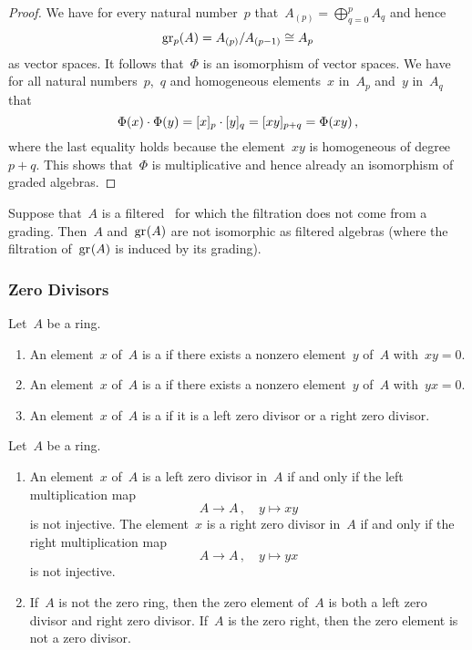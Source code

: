 \begin{proof}
	We have for every natural number~$p$ that~$A_{(p)} = \bigoplus_{q=0}^p A_q$ and hence
	\[
		\gr[p](A)
		=
		A_{(p)} / A_{(p-1)}
		\cong
		A_p
	\]
	as vector spaces.
	It follows that~$\Phi$ is an isomorphism of vector spaces.
	We have for all natural numbers~$p$,~$q$ and homogeneous elements~$x$ in~$A_p$ and~$y$ in~$A_q$ that
	\[
		\Phi(x) \cdot \Phi(y)
		=
		\lbrack x\rbrack_p \cdot \lbrack y\rbrack_q
		=
		\lbrack xy\rbrack_{p+q}
		=
		\Phi(xy) \,,
	\]
	where the last equality holds because the element~$xy$ is homogeneous of degree~$p + q$.
	This shows that~$\Phi$ is multiplicative and hence already an isomorphism of graded algebras.
\end{proof}


\begin{warning}
	Suppose that~$A$ is a filtered~\algebra{$\kf$} for which the filtration does not come from a grading.
	Then~$A$ and~$\gr(A)$ are not isomorphic as filtered algebras (where the filtration of~$\gr(A)$ is induced by its grading).
\end{warning}

\subsubsection{Zero Divisors}

\begin{definition}
	Let~$A$ be a ring.
	\begin{enumerate}
		\item
			An element~$x$ of~$A$ is a  if there exists a nonzero element~$y$ of~$A$ with~$xy = 0$.
		\item
			An element~$x$ of~$A$ is a  if there exists a nonzero element~$y$ of~$A$ with~$yx = 0$.
		\item
			An element~$x$ of~$A$ is a  if it is a left zero divisor or a right zero divisor.
	\end{enumerate}
\end{definition}


\begin{remark}
	Let~$A$ be a ring.
	\begin{enumerate}
		\item
			An element~$x$ of~$A$ is a left zero divisor in~$A$ if and only if the left multiplication map
			\[
				A \to A \,,
				\quad
				y \mapsto xy
			\]
			is not injective.
			The element~$x$ is a right zero divisor in~$A$ if and only if the right multiplication map
			\[
				A \to A \,,
				\quad
				y \mapsto yx
			\]
			is not injective.
		\item
			If~$A$ is not the zero ring, then the zero element of~$A$ is both a left zero divisor and right zero divisor.
			If~$A$ is the zero right, then the zero element is not a zero divisor.
	\end{enumerate}
\end{remark}


